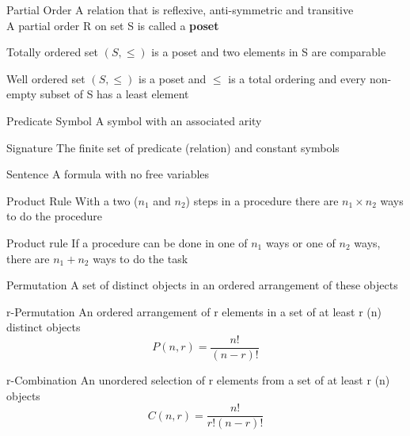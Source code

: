 \documentclass[grid,avery5371]{flashcards}
\begin{document}
\begin{flashcard}[]{Partial Order}
	A relation that is reflexive, anti-symmetric and transitive\\
	A partial order R on set S is called a \textbf{poset}
\end{flashcard}

\begin{flashcard}[]{Totally ordered set}
	$(S,\leq)$ is a poset and two elements in S are comparable
\end{flashcard}

\begin{flashcard}[]{Well ordered set}
	$(S,\leq)$ is a poset and $\leq$ is a total ordering and every non-empty subset of S has a least element
\end{flashcard}

\begin{flashcard}[]{Predicate Symbol}
	A symbol with an associated arity
\end{flashcard}

\begin{flashcard}[]{Signature}
	The finite set of predicate (relation) and constant symbols
\end{flashcard}

\begin{flashcard}[]{Sentence}
	A formula with no free variables
\end{flashcard}

\begin{flashcard}[]{Product Rule}
	With a two ($n_1$ and $n_2$) steps in a procedure there are $n_1\times n_2$ ways to do the procedure
\end{flashcard}

\begin{flashcard}[]{Product rule}
	If a procedure can be done in one of $n_1$ ways or one of $n_2$ ways, there are $n_1+n_2$ ways to do the task
\end{flashcard}

\begin{flashcard}[]{Permutation}
	A set of distinct objects in an ordered arrangement of these objects
\end{flashcard}

\begin{flashcard}[]{r-Permutation}
	An ordered arrangement of r elements in a set of at least r (n) distinct objects
	$$P(n,r)=\dfrac{n!}{(n-r)!}$$
\end{flashcard}

\begin{flashcard}[]{r-Combination}
	An unordered selection of r elements from a set of at least r (n) objects
	$$C(n,r)=\dfrac{n!}{r!(n-r)!}$$
\end{flashcard}
\end{document}
